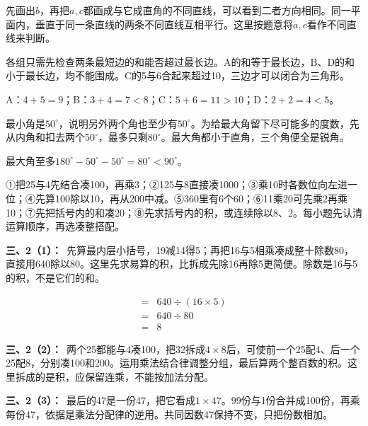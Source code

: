 \documentclass[multi=snippet,border=0pt]{standalone}
\newenvironment{snippet}[3]{\begin{minipage}{#1bp}\color{answerred}\fontsize{#2}{#3}\selectfont\raggedright}{\end{minipage}}
\begin{document}
\begin{snippet}{505}{11.5}{14}先画出\(b\)，再把\(a,c\)都画成与它成直角的不同直线，可以看到二者方向相同。同一平面内，垂直于同一条直线的两条不同直线互相平行。这里按题意将\(a,c\)看作不同直线来判断。\end{snippet}
\begin{snippet}{505}{11.5}{14}各组只需先检查两条最短边的和能否超过最长边。A的和等于最长边，B、D的和小于最长边，均不能围成。C的5与6合起来超过10，三边才可以闭合为三角形。\par A：\(4+5=9\)；B：\(3+4=7<8\)；C：\(5+6=11>10\)；D：\(2+2=4<5\)。\end{snippet}
\begin{snippet}{505}{11.5}{14}最小角是\(50^\circ\)，说明另外两个角也至少有\(50^\circ\)。为给最大角留下尽可能多的度数，先从内角和扣去两个\(50^\circ\)，最多只剩\(80^\circ\)。最大角都小于直角，三个角便全是锐角。\par 最大角至多\(180^\circ-50^\circ-50^\circ=80^\circ<90^\circ\)。\end{snippet}
\begin{snippet}{505}{11.5}{14}①把25与4先结合凑100，再乘3；②125与8直接凑1000；③乘10时各数位向左进一位；④先算100除以10，再从200中减。⑤360里有6个60；⑥11乘20可先乘2再乘10；⑦先把括号内的和凑20；⑧先求括号内的积，或连续除以8、2。每小题先认清运算顺序，再选凑整搭配。\end{snippet}
\begin{snippet}{505}{11.5}{14}\textbf{三、2（1）：}\ 先算最内层小括号，19减14得5；再把16与5相乘凑成整十除数80，直接用640除以80。这里先求易算的积，比拆成先除16再除5更简便。除数是16与5的积，不是它们的和。\end{snippet}
\begin{snippet}{176.445529683431}{10.5}{12.8}\[\begin{aligned}={}&640\div(16\times5)\\={}&640\div80\\={}&8\end{aligned}\]\end{snippet}
\begin{snippet}{505}{11.5}{14}\textbf{三、2（2）：}\ 两个25都能与4凑100，把32拆成\(4\times8\)后，可使前一个25配4、后一个25配8，分别凑100和200。运用乘法结合律调整分组，最后算两个整百数的积。这里拆成的是积，应保留连乘，不能按加法分配。\end{snippet}
\begin{snippet}{505}{11.5}{14}\textbf{三、2（3）：}\ 最后的47是一份47，把它看成\(1\times47\)。99份与1份合并成100份，再乘每份47，依据是乘法分配律的逆用。共同因数47保持不变，只把份数相加。\end{snippet}
\end{document}
